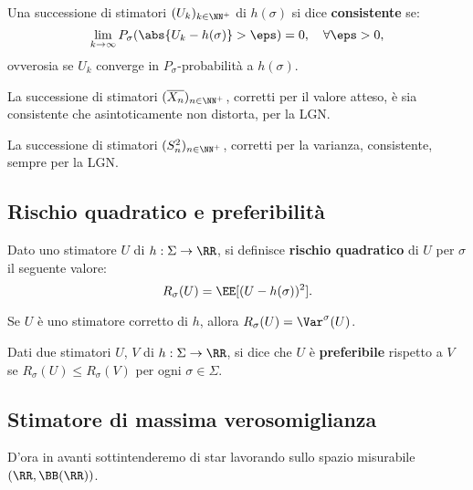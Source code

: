 \begin{multicols*}{2}
\begin{definition}
    Una successione di stimatori $(U_k)_{k \in \NN^+}$ di $h(\sigma)$ si dice
    \textbf{consistente} se:
    \[
        \lim_{k \to \infty} P_\sigma(\abs{U_k - h(\sigma)} > \eps) = 0, \quad \forall \eps > 0,
    \]
    ovverosia se $U_k$ converge in $P_\sigma$-probabilità a $h(\sigma)$.
\end{definition}

\begin{remark}
    La successione di stimatori $(\overline{X_n})_{n \in \NN^+}$, corretti per
    il valore atteso, è sia consistente che
    asintoticamente non distorta, per la LGN.
\end{remark}

\begin{remark}
    La successione di stimatori $(S^2_n)_{n \in \NN^+}$, corretti per la
    varianza, consistente, sempre per la LGN.
\end{remark}

\subsection{Rischio quadratico e preferibilità}

\begin{definition}
    Dato uno stimatore $U$ di $h : \Sigma \to \RR$, si definisce
    \textbf{rischio quadratico} di $U$ per $\sigma$ il seguente valore:
    \[
        R_\sigma(U) = \EE[(U - h(\sigma))^2].
    \]
\end{definition}

\begin{remark}
    Se $U$ è uno stimatore corretto di $h$, allora
    $R_\sigma(U) = \Var^\sigma(U)$.
\end{remark}

\begin{definition}[Preferibilità]
    Dati due stimatori $U$, $V$ di $h : \Sigma \to \RR$, si dice
    che $U$ è \textbf{preferibile} rispetto a $V$ se
    $R_\sigma(U) \leq R_\sigma(V)$ per ogni $\sigma \in \Sigma$.
\end{definition}

\subsection{Stimatore di massima verosomiglianza}

D'ora in avanti sottintenderemo di star lavorando sullo
spazio misurabile $(\RR, \BB(\RR))$.


\end{multicols*}

